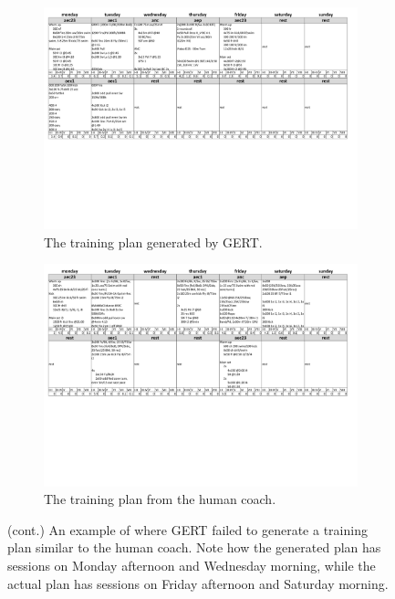 \begin{figure}\ContinuedFloat
    \begin{subfigure}[t]{\textwidth}
        \centering
        \includegraphics[width=\textwidth,trim={0 8cm 0 0},clip]{chapters/figures/result_examples/bad_pred.pdf}
        \captionsetup{width=.9\linewidth}
        \caption{The training plan generated by GERT.}
    \end{subfigure}
    
    \begin{subfigure}[t]{\textwidth}
        \centering
        \includegraphics[width=\textwidth,trim={0 8cm 0 0},clip]{chapters/figures/result_examples/bad_true.pdf}
        \captionsetup{width=.9\linewidth}
        \caption{The training plan from the human coach.}
    \end{subfigure}
    \caption{(cont.) An example of where GERT failed to generate a training plan similar to the human coach. Note how the generated plan has sessions on Monday afternoon and Wednesday morning, while the actual plan has sessions on Friday afternoon and Saturday morning.}
    \label{fig:gert_bad_example}
\end{figure}

